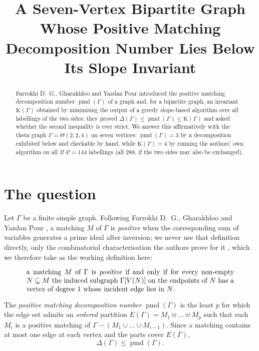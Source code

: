 \documentclass[11pt]{amsart}
\title[A bipartite graph with $\pmd<\Kinv$]
{A Seven-Vertex Bipartite Graph Whose Positive Matching Decomposition Number
 Lies Below Its Slope Invariant}
\date{}
\theoremstyle{remark}
\newcommand{\pmd}{\operatorname{pmd}}
\newcommand{\Kinv}{\mathrm{K}}
\newcommand{\Gam}{\Gamma}
\begin{document}
\begin{abstract}
Farrokhi D.~G., Gharakhloo and Yazdan Pour introduced the positive matching
decomposition number $\pmd(\Gam)$ of a graph and, for a bipartite graph, an
invariant $\Kinv(\Gam)$ obtained by minimising the output of a greedy
slope-based algorithm over all labellings of the two sides; they proved
$\Delta(\Gam)\le\pmd(\Gam)\le\Kinv(\Gam)$ and asked whether the second
inequality is ever strict. We answer this affirmatively with the theta graph
$\Gam=\Theta(2,2,4)$ on seven vertices: $\pmd(\Gam)=3$ by a decomposition
exhibited below and checkable by hand, while $\Kinv(\Gam)=4$ by running the
authors' own algorithm on all $3!\,4!=144$ labellings (all $288$, if the two
sides may also be exchanged).
\end{abstract}

\maketitle

\section{The question}

Let $\Gam$ be a finite simple graph. Following Farrokhi D.~G., Gharakhloo and
Yazdan Pour \cite{FGY}, a matching $M$ of $\Gam$ is \emph{positive} when the
corresponding sum of variables generates a prime ideal after inversion; we
never use that definition directly, only the combinatorial characterisation the
authors prove for it \cite[criterion (iii)]{FGY}, which we therefore take as
the working definition here:

\begin{equation}\label{eq:pos}
\parbox{0.86\textwidth}{a matching $M$ of $\Gam$ is \emph{positive} if and only
if for every non-empty $N\subseteq M$ the induced subgraph $\Gam[V(N)]$ on the
endpoints of $N$ has a vertex of degree $1$ whose incident edge lies in $N$.}
\end{equation}

The \emph{positive matching decomposition number} $\pmd(\Gam)$ is the least $p$
for which the edge set admits an \emph{ordered} partition
$E(\Gam)=M_1\uplus\dots\uplus M_p$ such that each $M_i$ is a positive matching
of $\Gam-(M_1\cup\dots\cup M_{i-1})$. Since a matching contains at most one
edge at each vertex and the parts cover $E(\Gam)$,
\begin{equation}\label{eq:delta}
  \Delta(\Gam)\le\pmd(\Gam).
\end{equation}
\end{document}
